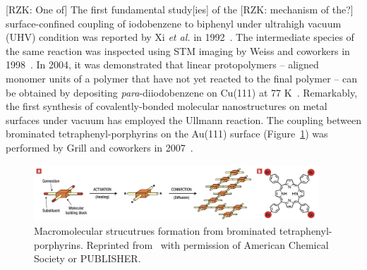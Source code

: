 \documentclass[journal=jacsat,manuscript=article]{achemso}
\begin{document}
[RZK: One of] The first fundamental study[ies] of the [RZK: mechanism of the?] surface-confined coupling of iodobenzene to biphenyl under ultrahigh vacuum (UHV) condition was reported by Xi \textit{et al.} in 1992~\cite{sur_sci01}.
%
The intermediate species of the same reaction was inspected using STM imaging by Weiss and coworkers in 1998~\cite{langm01}.
%
In 2004, it was demonstrated that linear protopolymers -- aligned monomer units of a polymer that have not yet reacted to the final polymer -- can be obtained by depositing \textit{para}-diiodobenzene on Cu(111) at 77 K~\cite{jacs01}. 
%
Remarkably, the first synthesis of covalently-bonded molecular nanostructures on metal surfaces under vacuum has employed the Ullmann reaction. The coupling between brominated tetraphenyl-porphyrins on the Au(111) surface (Figure~\ref{fig:first_model}) was performed by Grill and coworkers in 2007~\cite{Naturenano2007}. 

\begin{figure}[ht]
\centering
\includegraphics[width=0.95\textwidth]{Fig/Figure-2.png}
\caption{Macromolecular strucutrues formation from brominated tetraphenyl-porphyrins. Reprinted from~\cite{RZK} with permission of American Chemical Society or PUBLISHER.}
\label{fig:first_model}
\end{figure}
\end{document}
